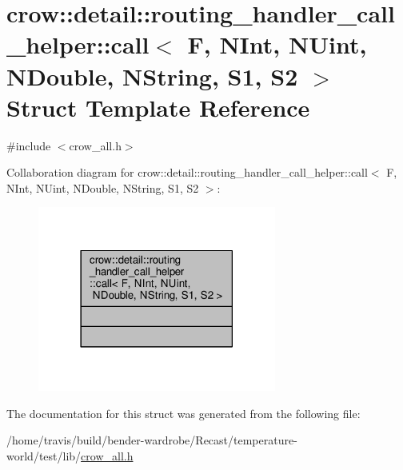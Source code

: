 \hypertarget{structcrow_1_1detail_1_1routing__handler__call__helper_1_1call}{\section{crow\-:\-:detail\-:\-:routing\-\_\-handler\-\_\-call\-\_\-helper\-:\-:call$<$ F, N\-Int, N\-Uint, N\-Double, N\-String, S1, S2 $>$ Struct Template Reference}
\label{structcrow_1_1detail_1_1routing__handler__call__helper_1_1call}
}


{\ttfamily \#include $<$crow\-\_\-all.\-h$>$}



Collaboration diagram for crow\-:\-:detail\-:\-:routing\-\_\-handler\-\_\-call\-\_\-helper\-:\-:call$<$ F, N\-Int, N\-Uint, N\-Double, N\-String, S1, S2 $>$\-:
\nopagebreak
\begin{figure}[H]
\begin{center}
\leavevmode
\includegraphics[width=222pt]{structcrow_1_1detail_1_1routing__handler__call__helper_1_1call__coll__graph}
\end{center}
\end{figure}


The documentation for this struct was generated from the following file\-:\begin{DoxyCompactItemize}
\item 
/home/travis/build/bender-\/wardrobe/\-Recast/temperature-\/world/test/lib/\hyperlink{crow__all_8h}{crow\-\_\-all.\-h}\end{DoxyCompactItemize}
